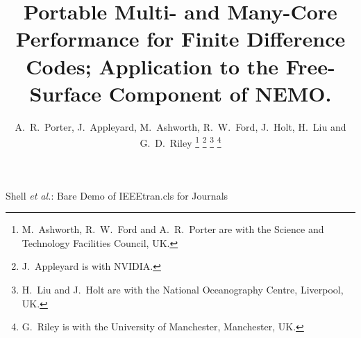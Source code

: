 \documentclass[journal]{IEEEtran}
\begin{document}
%
\title{Portable Multi- and Many-Core Performance for Finite Difference Codes;
  Application to the Free-Surface Component of NEMO.}
%
%

\author{A.~R.~Porter, J.~Appleyard, M.~Ashworth, R.~W.~Ford, J.~Holt, H.~Liu and G.~D.~Riley%
\thanks{M.~Ashworth, R.~W.~Ford and A.~R.~Porter are with the Science and Technology Facilities Council, UK.}%
\thanks{J.~Appleyard is with NVIDIA.}%
\thanks{H.~Liu and J.~Holt are with the National Oceanography Centre, Liverpool, UK.}%
\thanks{G.~Riley is with the University of Manchester, Manchester, UK.}%
}

% 
%


%
{Shell \MakeLowercase{\textit{et al.}}: Bare Demo of IEEEtran.cls for Journals}
% 


\end{document}
